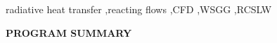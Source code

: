 \documentclass[preprint,12pt]{elsarticle}
\begin{document}
\begin{frontmatter}




\begin{keyword}
radiative heat transfer \sep reacting flows  \sep CFD \sep WSGG \sep RCSLW
\end{keyword}

\end{frontmatter}

\linenumbers


{\bf PROGRAM SUMMARY}
\end{document}
